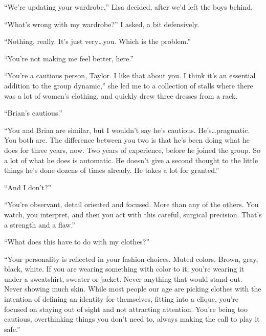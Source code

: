 





``We're updating your wardrobe,'' Lisa decided, after we'd left the boys behind.



``What's wrong with my wardrobe?'' I asked, a bit defensively.



``Nothing, really.  It's just very\ldots you.  Which is the problem.''



``You're not making me feel better, here.''



``You're a cautious person, Taylor.  I like that about you.  I think it's an essential addition to the group dynamic,'' she led me to a collection of stalls where there was a lot of women's clothing, and quickly drew three dresses from a rack.



``Brian's cautious.''



``You and Brian are similar, but I wouldn't say he's cautious.  He's\ldots pragmatic.  You both are.  The difference between you two is that he's been doing what he does for three years, now.  Two years of experience, before he joined the group.  So a lot of what he does is automatic.  He doesn't give a second thought to the little things he's done dozens of times already.  He takes a lot for granted.''



``And I don't?''



``You're observant, detail oriented and focused.  More than any of the others.  You watch, you interpret, and then you act with this careful, surgical precision. That's a strength and a flaw.''



``What does this have to do with my clothes?''



``Your personality is reflected in your fashion choices.  Muted colors.  Brown, gray, black, white.  If you are wearing something with color to it, you're wearing it under a sweatshirt, sweater or jacket.  Never anything that would stand out.  Never showing much skin.  While most people our age are picking clothes with the intention of defining an identity for themselves, fitting into a clique, you're focused on staying out of sight and not attracting attention.  You're being too cautious, overthinking things you don't need to, always making the call to play it safe.''



